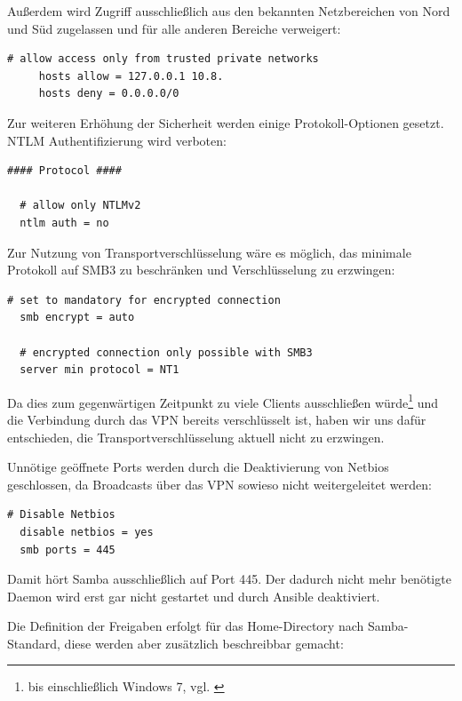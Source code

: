 Außerdem wird Zugriff ausschließlich aus den bekannten Netzbereichen von Nord und Süd zugelassen und für alle anderen Bereiche verweigert:

\begin{lstlisting}[label=code:smbconf2,caption=Ausschnitt aus /etc/samba/smb.conf]
  # allow access only from trusted private networks
     hosts allow = 127.0.0.1 10.8.
     hosts deny = 0.0.0.0/0
\end{lstlisting}

Zur weiteren Erhöhung der Sicherheit werden einige Protokoll-Optionen gesetzt. NTLM Authentifizierung wird verboten:

\begin{lstlisting}[label=code:smbconf3,caption=Ausschnitt aus /etc/samba/smb.conf]
  #### Protocol ####

  # allow only NTLMv2
  ntlm auth = no
  \end{lstlisting}
Zur Nutzung von Transportverschlüsselung wäre es möglich, das minimale Protokoll auf SMB3 zu beschränken und Verschlüsselung zu erzwingen:
\begin{lstlisting}[label=code:smbconf4,caption=Möglicher Eintrag in /etc/samba/smb.conf]
  # set to mandatory for encrypted connection
  smb encrypt = auto

  # encrypted connection only possible with SMB3
  server min protocol = NT1
  \end{lstlisting}

Da dies zum gegenwärtigen Zeitpunkt zu viele Clients ausschließen würde\footnote{bis einschließlich Windows 7, vgl. \cite{smbHistory}} und die Verbindung durch das VPN bereits verschlüsselt ist, haben wir uns dafür entschieden, die Transportverschlüsselung aktuell nicht zu erzwingen.

Unnötige geöffnete Ports werden durch die Deaktivierung von Netbios geschlossen, da Broadcasts über das VPN sowieso nicht weitergeleitet werden:
\begin{lstlisting}[label=code:smbconf5,caption=Auszug aus /etc/samba/smb.conf]
  # Disable Netbios
  disable netbios = yes
  smb ports = 445
\end{lstlisting}
Damit hört Samba ausschließlich auf Port 445. Der dadurch nicht mehr benötigte Daemon  wird erst gar nicht gestartet und durch Ansible deaktiviert.

Die Definition der Freigaben erfolgt für das Home-Directory nach Samba-Standard, diese werden aber zusätzlich beschreibbar gemacht:

